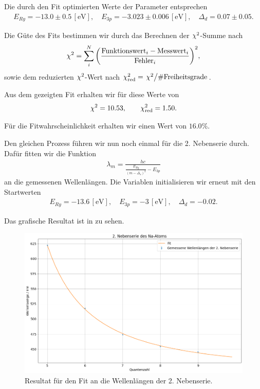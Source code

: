 Die durch den Fit optimierten Werte der Parameter entsprechen
\begin{align}
  E_{Ry} = -13.0 \pm 0.5\, [\si{\electronvolt}], \quad
  E_{3p} = -3.023 \pm 0.006\, [\si{\electronvolt}], \quad
  \Delta_d = 0.07 \pm 0.05.
\end{align}

Die Güte des Fits bestimmen wir durch das Berechnen der $\chi^{2}$-Summe nach
\begin{align}
  \chi^{2} = \sum_{i}^{N} \qty(\frac{\text{Funktionswert}_i - \text{Messwert}_i}{\text{Fehler}_i})^2,
\end{align}
sowie dem reduzierten $\chi^{2}$-Wert nach $\chisqrd = \flatfrac{\chisq}{\#\text{Freiheitsgrade}}$.

Aus dem gezeigten Fit erhalten wir für diese Werte von
\begin{align}
  \chi^{2} = 10.53,\qquad \chi^{2}_{\mathrm{red}} = 1.50.
\end{align}

Für die Fitwahrscheinlichkeit erhalten wir einen Wert von $16.0\%$.

Den gleichen Prozess führen wir nun noch einmal für die 2. Nebenserie durch. Dafür fitten wir die Funktion
\begin{align}
  \lambda_m = \frac{hc}{\frac{E_{Ry}}{(m - \Delta_s)^2} - E_{3p}}
\end{align}
an die gemessenen Wellenlängen. Die Variablen initialisieren wir erneut mit den Startwerten
\begin{align}
  E_{Ry} = -13.6\, [\si{\electronvolt}], \quad
  E_{3p} = -3\, [\si{\electronvolt}], \quad
  \Delta_d = -0.02.
\end{align}

Das grafische Resultat ist in  zu sehen.

\begin{figure}[H]
  \centering
  \includegraphics[width=.9\textwidth]{files/plots/na_2ns_fit.png}
  \caption{Resultat für den Fit an die Wellenlängen der 2. Nebenserie.}
  \label{fig:na_2ns_fit}
\end{figure}

